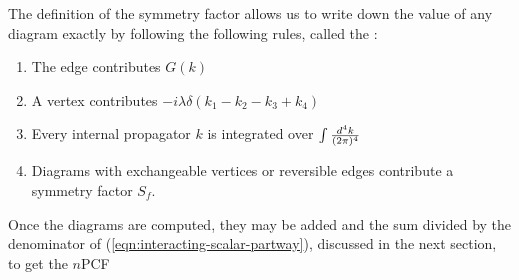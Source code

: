 The definition of the symmetry factor allows us to write down the value of any diagram exactly by following the following rules, called the :
\begin{enumerate}
  \item The edge  contributes $G(k)$
  \item A vertex  contributes $-i\lambda \delta(k_1 - k_2 - k_3 + k_4)$
  \item Every internal propagator $k$ is integrated over $\int \frac{d^{4} k}{(2\pi)^{4}}$
  \item Diagrams with exchangeable vertices or reversible edges contribute a symmetry factor $S_f$.
\end{enumerate}

Once the diagrams are computed, they may be added and the sum divided by the denominator of (\ref{eqn:interacting-scalar-partway}), discussed in the next section, to get the $n$PCF



    
